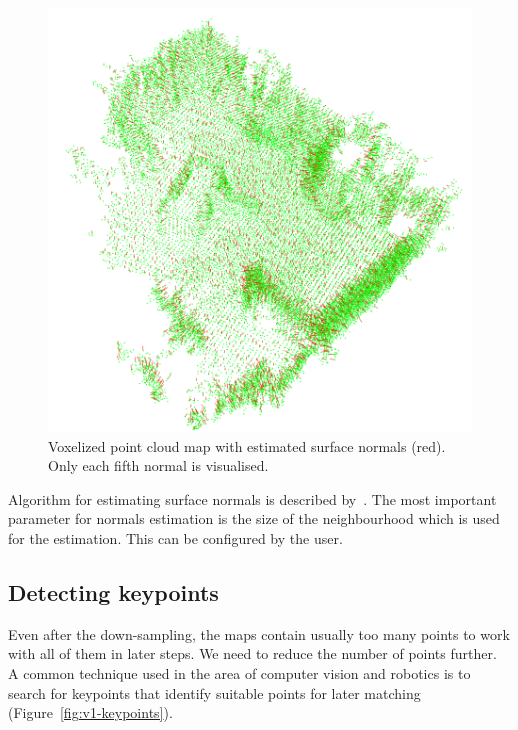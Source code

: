 \begin{figure}
    \centering
    \includegraphics[width=\textwidth]{../img/v1-normals.png}
    \caption[Point cloud map with estimated surface normals]{Voxelized point cloud map with estimated surface normals (red). Only each fifth normal is visualised.}
    \label{fig:v1-normals}
\end{figure}

Algorithm for estimating surface normals is described by~\citet{RusuDoctoralDissertation}. The most important parameter for normals estimation is the size of the neighbourhood which is used for the estimation. This can be configured by the user.

\subsection{Detecting keypoints}
\label{sec:detect-keypoints}

Even after the down-sampling, the maps contain usually too many points to work with all of them in later steps. We need to reduce the number of points further. A common technique used in the area of computer vision and robotics is to search for keypoints that identify suitable points for later matching (Figure~\ref{fig:v1-keypoints}).

